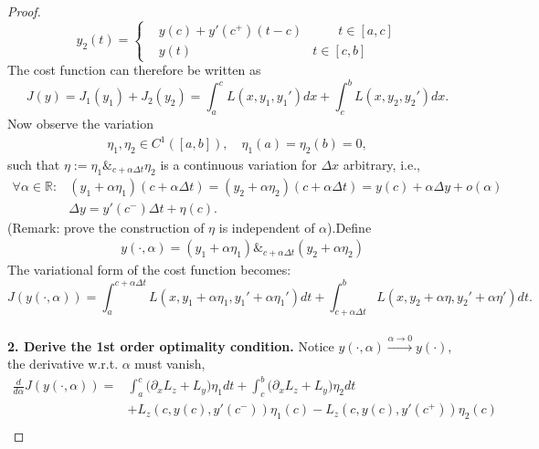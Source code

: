 \begin{proof}
\begin{equation*}
y_2(t) = \left\{
\begin{aligned}
	    &y(c) + y'(c^+)(t - c) &\qquad t \in [a, c]\\
	 		&  y(t) & t\in [c, b]
\end{aligned}
\right.
\end{equation*}
The cost function can therefore be written as 
\begin{equation*}
	J(y) = J_1(y_1) + J_2(y_2) 
	= \int_a^c L(x, y_1, y_1') dx + \int_c^b L(x, y_2, y_2') dx. 
\end{equation*} 
Now observe the variation 
\begin{align*}
	\eta_1, \eta_2 \in C^1([a, b]), \quad \eta_1(a) = \eta_2(b) = 0,
\end{align*}
such that $ \eta:= \eta_1 \&_{c + \alpha \Delta t} \eta_2$ is a continuous variation for $\Delta x$ arbitrary, i.e.,  
\begin{equation}
\begin{aligned}
	\forall \alpha \in \mathbb{R}: & (y_1 + \alpha \eta_1)(c + \alpha \Delta t) = (y_2+ \alpha \eta_2) (c + \alpha \Delta t) = y(c) + \alpha \Delta y + o(\alpha)\\
	& \Delta y = y'(c^-) \Delta t + \eta(c). 
\end{aligned}
\end{equation}
(Remark: prove the construction of $\eta$ is independent of $\alpha$).Define
\begin{align*}
	& y(\cdot, \alpha) = (y_1 + \alpha \eta_1) \&_{c + \alpha \Delta t} (y_2 + \alpha \eta_2)
\end{align*}
The variational form of the cost function becomes:
\begin{equation}
	J(y(\cdot, \alpha)) = \int_a^{c + \alpha\Delta t} L(x, y_1 + \alpha\eta_1, y_1' +\alpha\eta_1')dt + \int_{c + \alpha\Delta t}^b L(x, y_2 + \alpha\eta, y_2' + \alpha\eta')dt.
\end{equation}
\quad\\
\textbf{2. Derive the 1st order optimality condition.} 
Notice $y(\cdot, \alpha) \overset{\alpha \rightarrow 0}{\longrightarrow} y(\cdot)$, the derivative w.r.t. $\alpha$ must vanish, 
\begin{align*}
	\frac{d}{d\alpha}  J(y(\cdot, \alpha) ) = &
	\int_a^c \bigg(\partial_xL_z + L_y\bigg)\eta_1 dt + \int_c^b \bigg(\partial_x L_z + L_y\bigg)\eta_2dt \\
	& +L_z(c, y(c), y'(c^-))\eta_1(c) - L_z(c, y(c), y'(c^+))\eta_2(c)\\ 

\end{align*}
\end{proof}
